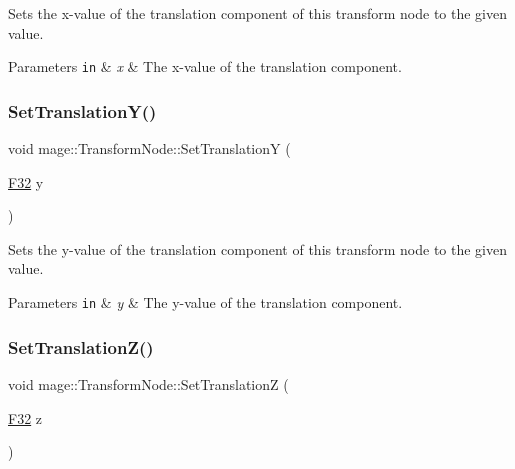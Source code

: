 Sets the x-\/value of the translation component of this transform node to the given value.


\begin{DoxyParams}[1]{Parameters}
\mbox{\tt in}  & {\em x} & The x-\/value of the translation component. \\
\hline
\end{DoxyParams}
\hypertarget{structmage_1_1_transform_node_a95f1b55e153664196d76d0664674569e}{}\label{structmage_1_1_transform_node_a95f1b55e153664196d76d0664674569e} 
\subsubsection{\texorpdfstring{Set\+Translation\+Y()}{SetTranslationY()}}
{\footnotesize\ttfamily void mage\+::\+Transform\+Node\+::\+Set\+TranslationY (\begin{DoxyParamCaption}\item[{\hyperlink{namespacemage_aa97e833b45f06d60a0a9c4fc22ae02c0}{F32}}]{y }\end{DoxyParamCaption})\hspace{0.3cm}{\ttfamily [noexcept]}}

Sets the y-\/value of the translation component of this transform node to the given value.


\begin{DoxyParams}[1]{Parameters}
\mbox{\tt in}  & {\em y} & The y-\/value of the translation component. \\
\hline
\end{DoxyParams}
\hypertarget{structmage_1_1_transform_node_abfdab39fb0ae4dd14ee7e340fa622693}{}\label{structmage_1_1_transform_node_abfdab39fb0ae4dd14ee7e340fa622693} 
\subsubsection{\texorpdfstring{Set\+Translation\+Z()}{SetTranslationZ()}}
{\footnotesize\ttfamily void mage\+::\+Transform\+Node\+::\+Set\+TranslationZ (\begin{DoxyParamCaption}\item[{\hyperlink{namespacemage_aa97e833b45f06d60a0a9c4fc22ae02c0}{F32}}]{z }\end{DoxyParamCaption})\hspace{0.3cm}{\ttfamily [noexcept]}}

